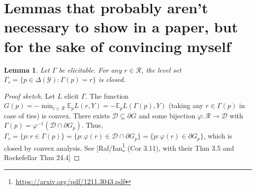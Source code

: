 \documentclass[12pt]{article}
\newcommand{\D}{\mathcal{D}}
\newcommand{\E}{\mathbb{E}}
\newcommand{\R}{\mathcal{R}}
\newcommand{\Y}{\mathcal{Y}}
\newtheorem{lemma}{Lemma}
\begin{document}
%
%
%



\section{Lemmas that probably aren't necessary to show in a paper, but for the sake of convincing myself}

\begin{lemma}\label{lem:closed-level-sets}
	Let $\Gamma$ be elicitable.
	For any $r\in\R$, the level set $\Gamma_r = \{ p \in \Delta(\Y) : \Gamma(p) = r \}$ is closed.
\end{lemma}
\begin{proof}[Proof sketch]
	Let $L$ elicit $\Gamma$.
	The function $G(p) = -\min_{r\in\R} \E_p L(r,Y) = -\E_p L(\Gamma(p),Y)$ (taking any $r\in\Gamma(p)$ in case of ties) is convex.
	There exists $\D \subseteq \partial G$ and some bijection $\varphi : \R \to \D$ with $\Gamma(p) = \varphi^{-1}(\D\cap \partial G_p)$.
	Thus, $\Gamma_r = \{p : r\in\Gamma(p)\} = \{p : \varphi(r) \in \D\cap\partial G_p\} = \{p : \varphi(r) \in \partial G_p\}$, which is closed by convex analysis.
	See [Raf/Ian\footnote{\url{https://arxiv.org/pdf/1211.3043.pdf}} (Cor 3.11), with their Thm 3.5 and Rockefellar Thm 24.4]  
\end{proof}
\end{document}
